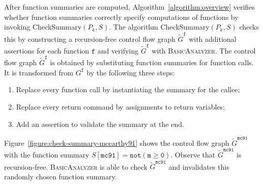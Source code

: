 After function summaries are computed, Algorithm~\ref{algorithm:overview} 
verifies whether function summaries correctly specify computations of
functions by invoking CheckSummary$(P_k, S)$. The algorithm CheckSummary$(P_k, S)$ checks this by constructing a recursion-free control flow 
graph $\tilde{G}^{\mathtt{f}}$ with additional assertions for each
function $\mathtt{f}$ and verifying $\tilde{G}^{\mathtt{f}}$ with
\textsc{BasicAnalyzer}. The control flow graph
$\tilde{G}^{\mathtt{f}}$ is obtained by substituting function
summaries for function calls.
It is transformed from $G^{\mathtt{f}}$ by the
following three steps:
\begin{enumerate}
\item Replace every function call by instantiating the summary for the
  callee;
\item Replace every return command by assignments to return variables;
\item Add an assertion to validate the summary at the end.
\end{enumerate}
Figure~\ref{figure:check-summary-mccarthy91} shows the control flow
graph $\tilde{G}^{\mathtt{mc91}}$ with the function summary
$S[{\mathtt{mc91}}] = \mathtt{not (m \geq 0)}$. Observe that
$\tilde{G}^{\mathtt{mc91}}$ is
recursion-free. \textsc{BasicAnalyzer} is able to check
$\tilde{G}^{\mathtt{mc91}}$ and invalidates this randomly chosen function summary. 

